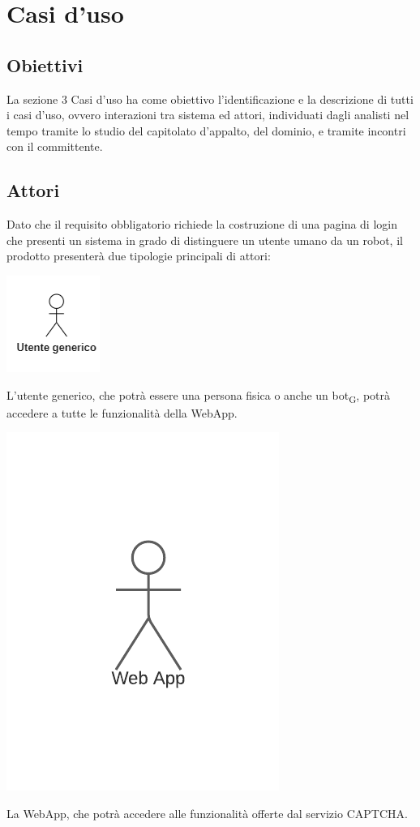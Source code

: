 \section{Casi d'uso}

\subsection{Obiettivi}
La sezione 3 Casi d'uso ha come obiettivo l'identificazione e la descrizione di tutti i casi d'uso, ovvero interazioni tra sistema ed attori, individuati dagli analisti nel tempo tramite lo studio del capitolato d'appalto, del dominio, e tramite incontri con il committente.

\subsection{Attori}
Dato che il requisito obbligatorio richiede la costruzione di una pagina di login che presenti un sistema in grado di distinguere un utente umano da un robot, il prodotto presenterà due tipologie principali di attori:
\begin{center}
\includegraphics[scale = 1]{img/utente_generico.png}\\
\end{center}
L'utente generico, che potrà essere una persona fisica o anche un bot\textsubscript{G}, potrà accedere a tutte le funzionalità della WebApp. \\
\begin{center}
\includegraphics[scale = 1]{img/webapp.png}\\
\end{center}
La WebApp, che potrà accedere alle funzionalità offerte dal servizio CAPTCHA. \\

